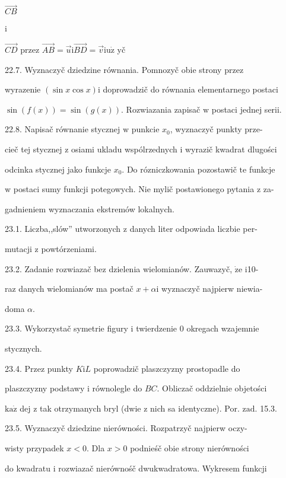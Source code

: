 \documentclass[a4paper,12pt]{article}
\begin{document}
$\vec{CB}$

i

$\vec{CD}$ przez $\vec{AB}=\vec{u} \mathrm{i} \vec{BD}=\vec{v}\mathrm{i}\mathrm{u}\dot{\mathrm{z}}$ yč

22.7. Wyznaczyč dziedzine równania. Pomnozyč obie strony przez

wyrazenie $(\sin x\cos x) \mathrm{i}$ doprowadzič do równania elementarnego postaci

$\sin(f(x))=\sin(g(x))$. Rozwiazania zapisač $\mathrm{w}$ postaci jednej serii.

22.8. Napisač równanie stycznej $\mathrm{w}$ punkcie $x_{0}$, wyznaczyč punkty prze-

cieč tej stycznej $\mathrm{z}$ osiami ukladu wspólrzednych $\mathrm{i}$ wyrazič kwadrat dlugości

odcinka stycznej jako funkcje $x_{0}$. Do rózniczkowania pozostawič $\mathrm{t}\mathrm{e}$ funkcje

$\mathrm{w}$ postaci sumy funkcji potegowych. Nie mylič postawionego pytania $\mathrm{z}$ za-

gadnieniem wyznaczania ekstremów lokalnych.

23.1. Liczba,,slów'' utworzonych $\mathrm{z}$ danych liter odpowiada liczbie per-

mutacji $\mathrm{z}$ powtórzeniami.

23.2. Zadanie rozwiazač bez dzielenia wielomianów. Zauwazyč, $\dot{\mathrm{z}}\mathrm{e}$ i10-

raz danych wielomianów ma postač $ x+\alpha \mathrm{i}$ wyznaczyč najpierw niewia-

doma $\alpha.$

23.3. Wykorzystač symetrie figury $\mathrm{i}$ twierdzenie $0$ okregach wzajemnie

stycznych.

23.4. Przez punkty $K \mathrm{i} L$ poprowadzič plaszczyzny prostopadle do

plaszczyzny podstawy $\mathrm{i}$ równolegle do $BC$. Obliczač oddzielnie objetości

$\mathrm{k}\mathrm{a}\dot{\mathrm{z}}$ dej $\mathrm{z}$ tak otrzymanych bryl (dwie $\mathrm{z}$ nich sa identyczne). Por. $\mathrm{z}\mathrm{a}\mathrm{d}$. 15.3.

23.5. Wyznaczyč dziedzine nierówności. Rozpatrzyč najpierw oczy-

wisty przypadek $x < 0$. Dla $x > 0$ podnieśč obie strony nierówności

do kwadratu $\mathrm{i}$ rozwiazač nierównośč dwukwadratowa. Wykresem funkcji
\end{document}

